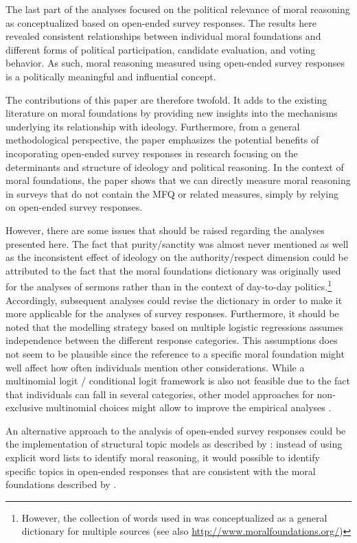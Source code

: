\documentclass[12pt]{article}
\begin{document}
The last part of the analyses focused on the political relevance of moral reasoning as conceptualized based on open-ended survey responses. The results here revealed consistent relationships between individual moral foundations and different forms of political participation, candidate evaluation, and voting behavior. As such, moral reasoning measured using open-ended survey responses is a politically meaningful and influential concept.

The contributions of this paper are therefore twofold. It adds to the existing literature on moral foundations by providing new insights into the mechanisms underlying its relationship with ideology. Furthermore, from a general methodological perspective, the paper emphasizes the potential benefits of incoporating open-ended survey responses in research focusing on the determinants and structure of ideology and political reasoning. In the context of moral foundations, the paper shows that we can directly measure moral reasoning in surveys that do not contain the MFQ or related measures, simply by relying on open-ended survey responses.

However, there are some issues that should be raised regarding the analyses presented here. The fact that purity/sanctity was almost never mentioned as well as the inconsistent effect of ideology on the authority/respect dimension could be attributed to the fact that the moral foundations dictionary was originally used for the analyses of sermons rather than in the context of day-to-day politics.\footnote{However, the collection of words used in \citet{graham2009liberals} was conceptualized as a general dictionary for multiple sources (see also \url{http://www.moralfoundations.org/})} Accordingly, subsequent analyses could revise the dictionary in order to make it more applicable for the analyses of survey responses. Furthermore, it should be noted that the modelling strategy based on multiple logistic regressions assumes independence between the different response categories. This assumptions does not seem to be plausible since the reference to a specific moral foundation might well affect how often individuals mention other considerations. While a multinomial logit / conditional logit framework is also not feasible due to the fact that individuals can fall in several categories, other model approaches for non-exclusive multinomial choices might allow to improve the empirical analyses \citep[see for example][]{gilbert2007models}.

An alternative approach to the analysis of open-ended survey responses could be the implementation of structural topic models as described by \citet{roberts2014structural}: instead of using explicit word lists to identify moral reasoning, it would possible to identify specific topics in open-ended responses that are consistent with the moral foundations described by \citet{haidt2008moral} \citep[see also][]{lin2008joint}.
\end{document}
